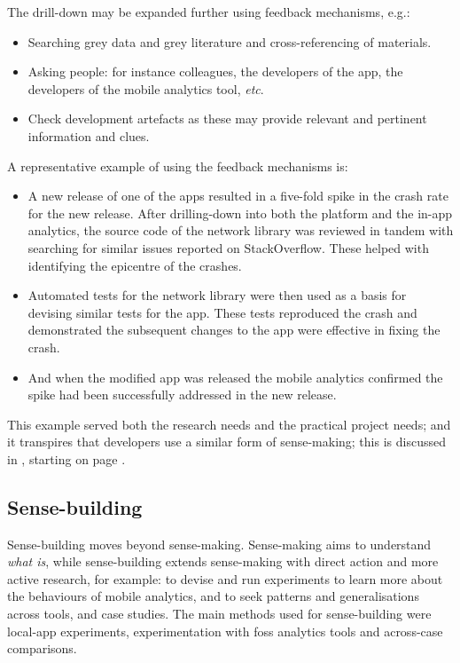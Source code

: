 The drill-down may be expanded further using feedback mechanisms, e.g.:
 
\begin{itemize}
\itemsep0em
\item Searching grey data and grey literature and cross-referencing of materials.
    \item Asking people: for instance colleagues, the developers of the app, the developers of the mobile analytics tool, \textit{etc}.
    \item Check development artefacts as these may provide relevant and pertinent information and clues.
\end{itemize}

A representative example of using the feedback mechanisms is:

\begin{itemize}
    \item A new release of one of the apps resulted in a five-fold spike in the crash rate for the new release. After drilling-down into both the platform and the in-app analytics, the source code of the network library was reviewed in tandem with searching for similar issues reported on StackOverflow. These helped with identifying the epicentre of the crashes.
    \item Automated tests for the network library were then used as a basis for devising similar tests for the app. These tests reproduced the crash and demonstrated the subsequent changes to the app were effective in fixing the crash.
    \item And when the modified app was released the mobile analytics confirmed the spike had been successfully addressed in the new release.
\end{itemize}

This example served both the research needs and the practical project needs; and it transpires that developers use a similar form of sense-making; this is discussed in , starting on page \pageref{sensemaking-and-decision-taking-by-developers-section}.

\subsection{Sense-building}
Sense-building moves beyond sense-making. Sense-making aims to understand \textit{what is}, while sense-building extends sense-making with direct action and more active research, for example: to devise and run experiments to learn more about the behaviours of mobile analytics, and to seek patterns and generalisations across tools, and case studies. The main methods used for sense-building were local-app experiments, experimentation with \Gls{foss} analytics tools and across-case comparisons. 

